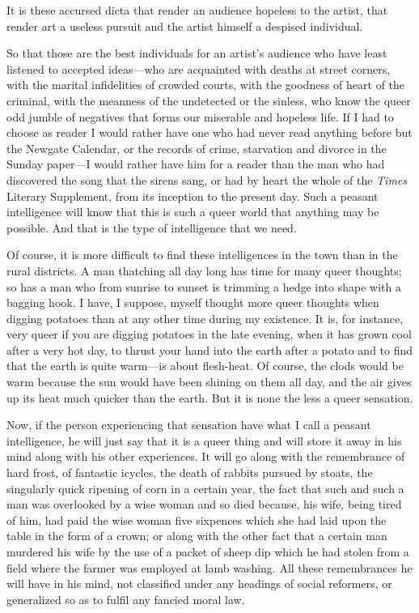 It is these accursed dicta that render an audience hopeless to the
artist, that render art a useless pursuit and the artist himself a
despised individual.

So that those are the best individuals for an artist's audience who have
least listened to accepted ideas---who are acquainted with deaths at
street corners, with the marital infidelities of crowded courts, with
the goodness of heart of the criminal, with the meanness of the
undetected or the sinless, who know the queer odd jumble of negatives
that forms our miserable and hopeless life. If I had to choose as reader
I would rather have one who had never read anything before but the
Newgate Calendar, or the records of crime, starvation and divorce in the
Sunday paper---I would rather have him for a reader than the man who had
discovered the song that the sirens sang, or had by heart the whole of
the \emph{Times} Literary Supplement, from its inception to the present
day. Such a peasant intelligence will know that this is such a queer
world that anything may be possible. And that is the type of
intelligence that we need.

Of course, it is more difficult to find these intelligences in the town
than in the rural districts. A man thatching all day long has time for
many queer thoughts; so has a man who from sunrise to sunset is trimming
a hedge into shape with a bagging hook. I have, I suppose, myself
thought more queer thoughts when digging potatoes than at any other time
during my existence. It is, for instance, very queer if you are digging
potatoes in the late evening, when it has grown cool after a very hot
day, to thrust your hand into the earth after a potato and to find that
the earth is quite warm---is about flesh-heat. Of course, the clods
would be warm because the sun would have been shining on them all day,
and the air gives up its heat much quicker than the earth. But it is
none the less a queer sensation.

Now, if the person experiencing that sensation have what I call a
peasant intelligence, he will just say that it is a queer thing and will
store it away in his mind along with his other experiences. It will go
along with the remembrance of hard frost, of fantastic icycles, the
death of rabbits pursued by stoats, the singularly quick ripening of
corn in a certain year, the fact that such and such a man was overlooked
by a wise woman and so died because, his wife, being tired of him, had
paid the wise woman five sixpences which she had laid upon the table in
the form of a crown; or along with the other fact that a certain man
murdered his wife by the use of a packet of sheep dip which he had
stolen from a field where the farmer was employed at lamb washing. All
these remembrances he will have in his mind, not classified under any
headings of social reformers, or generalized so as to fulfil any fancied
moral law.

